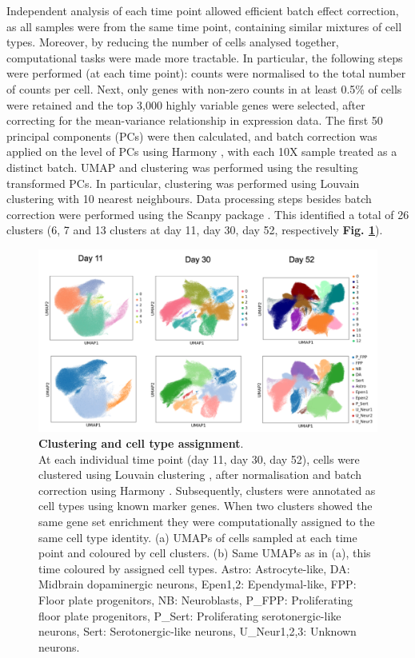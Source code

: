 Independent analysis of each time point allowed efficient batch effect correction, as all samples were from the same time point, containing similar mixtures of cell types.
Moreover, by reducing the number of cells analysed together, computational tasks were made more tractable.
In particular, the following steps were performed (at each time point): counts were normalised to the total number of counts per cell. 
Next, only genes with non-zero counts in at least 0.5\% of cells were retained and the top 3,000 highly variable genes were selected, after correcting for the mean-variance relationship in expression data. 
The first 50 principal components (PCs) were then calculated, and batch correction was applied on the level of PCs using Harmony \cite{korsunsky2019fast}, with each 10X sample treated as a distinct batch. 
UMAP and clustering was performed using the resulting transformed PCs. 
In particular, clustering was performed using Louvain clustering \cite{blondel2008fast} with 10 nearest neighbours. 
Data processing steps besides batch correction were performed using the Scanpy package \cite{wolf2018scanpy}. 
This identified a total of 26 clusters (6, 7 and 13 clusters at day 11, day 30, day 52, respectively \textbf{Fig. \ref{fig:neuroseq_clusters}}). \\

\begin{figure}[h]
\centering
\includegraphics[width=16cm]{Chapter5/Fig/neuroseq_clusters_celltypes.png}
\caption[Clustering and cell type assignment]{\textbf{Clustering and cell type assignment}.\\
At each individual time point (day 11, day 30, day 52), cells were clustered using Louvain clustering \cite{blondel2008fast}, after normalisation and batch correction using Harmony \cite{korsunsky2019fast}.
Subsequently, clusters were annotated as cell types using known marker genes. 
When two clusters showed the same gene set enrichment they were computationally assigned to the same cell type identity. 
(a) UMAPs of cells sampled at each time point and coloured by cell clusters. 
(b) Same UMAPs as in (a), this time coloured by assigned cell types.
Astro: Astrocyte-like, DA: Midbrain dopaminergic neurons, Epen1,2: Ependymal-like, FPP: Floor plate progenitors, NB: Neuroblasts, P\_FPP: Proliferating floor plate progenitors, P\_Sert: Proliferating serotonergic-like neurons, Sert: Serotonergic-like neurons, U\_Neur1,2,3: Unknown neurons.}
\label{fig:neuroseq_clusters}
\end{figure}

